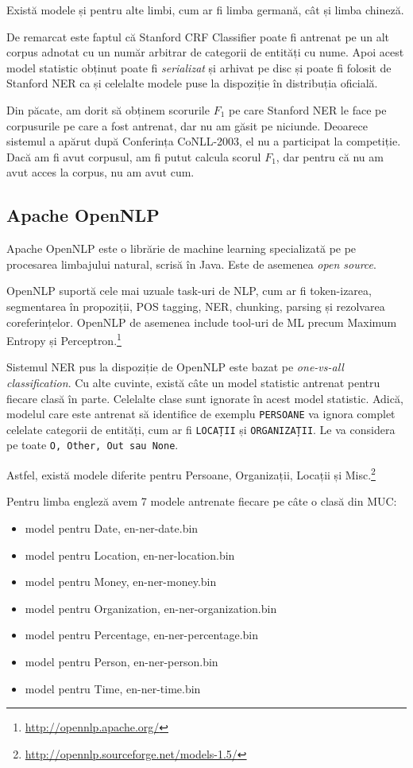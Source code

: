 Există modele și pentru alte limbi, cum ar fi limba germană, cât și limba chineză.

De remarcat este faptul că Stanford CRF Classifier poate fi antrenat pe un alt corpus adnotat cu un număr arbitrar de categorii de entități cu nume. Apoi acest model statistic obținut poate fi \textit{serializat} și arhivat pe disc și poate fi folosit de Stanford NER ca și celelalte modele puse la dispoziție în distribuția oficială.

Din păcate, am dorit să obținem scorurile $F_1$ pe care Stanford NER le face pe corpusurile pe care a fost antrenat, dar nu am găsit pe niciunde. Deoarece sistemul a apărut după Conferința CoNLL-2003, el nu a participat la competiție. Dacă am fi avut corpusul, am fi putut calcula scorul $F_1$, dar pentru că nu am avut acces la corpus, nu am avut cum.


\subsection{Apache OpenNLP}

Apache OpenNLP este o librărie de machine learning specializată pe pe procesarea limbajului natural, scrisă în Java. Este de asemenea \textit{open source}.


OpenNLP suportă cele mai uzuale task-uri de NLP, cum ar fi token-izarea, segmentarea în propoziții, POS tagging, NER, chunking, parsing și rezolvarea coreferințelor. OpenNLP de asemenea include tool-uri de ML precum Maximum Entropy și Perceptron.\footnote{\url{http://opennlp.apache.org/}}


Sistemul NER pus la dispoziție de OpenNLP este bazat pe \textit{one-vs-all classification}. Cu alte cuvinte, există câte un model statistic antrenat pentru fiecare clasă în parte. Celelalte clase sunt ignorate în acest model statistic. Adică, modelul care este antrenat să identifice de exemplu \texttt{PERSOANE} va ignora complet celelate categorii de entități, cum ar fi \texttt{LOCAȚII} și \texttt{ORGANIZAȚII}. Le va considera pe toate \texttt{O, Other, Out sau None}.

Astfel, există modele diferite pentru Persoane, Organizații, Locații și Misc.\footnote{\url{http://opennlp.sourceforge.net/models-1.5/}}

Pentru limba engleză avem 7 modele antrenate fiecare pe câte o clasă din MUC:

\begin{itemize}
\item model pentru Date, en-ner-date.bin
\item model pentru Location, en-ner-location.bin
\item model pentru Money,	en-ner-money.bin
\item model pentru Organization,	en-ner-organization.bin
\item model pentru Percentage,	en-ner-percentage.bin
\item model pentru Person,	en-ner-person.bin
\item model pentru Time, en-ner-time.bin
\end{itemize}

